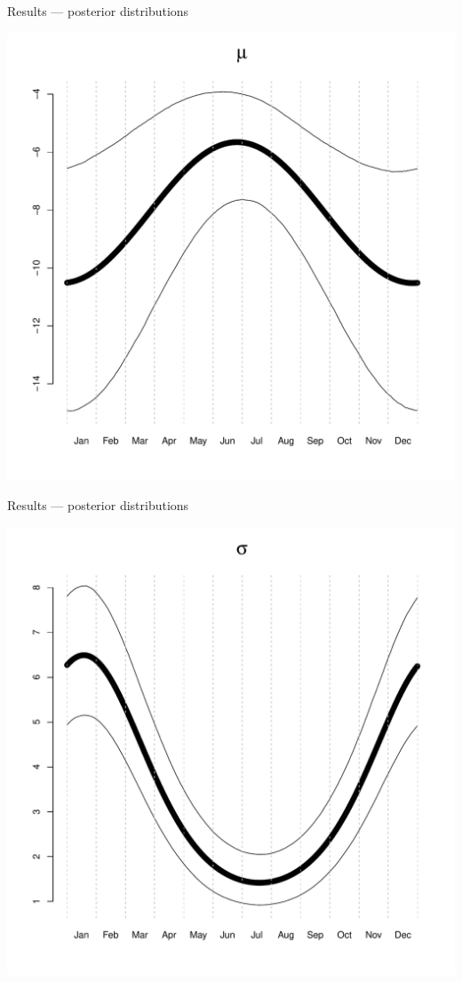 \documentclass[mathserif, 11pt, t]{beamer}
\begin{document}
\begin{frame}{Results --- posterior distributions}
\begin{center}
\includegraphics[scale=0.30]{../figs/post_mu.pdf}
\end{center}
\end{frame}

\begin{frame}{Results --- posterior distributions}
\begin{center}
\includegraphics[scale=0.30]{../figs/post_sig.pdf}
\end{center}
\end{frame}
\end{document}

